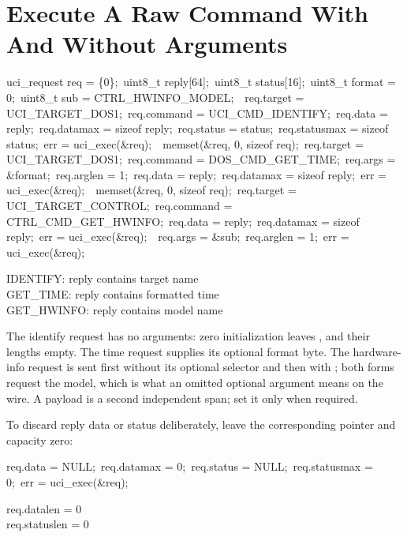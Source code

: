 \section{Execute A Raw Command With And Without Arguments}

\begin{listingbox}
uci\_request req = \{0\};\
uint8\_t reply[64];\
uint8\_t status[16];\
uint8\_t format = 0;\
uint8\_t sub = CTRL\_HWINFO\_MODEL;\
\
req.target = UCI\_TARGET\_DOS1;\
req.command = UCI\_CMD\_IDENTIFY;\
req.data = reply;\
req.datamax = sizeof reply;\
req.status = status;\
req.statusmax = sizeof status;\
err = uci\_exec(\&req);\
\
memset(\&req, 0, sizeof req);\
req.target = UCI\_TARGET\_DOS1;\
req.command = DOS\_CMD\_GET\_TIME;\
req.args = \&format;\
req.arglen = 1;\
req.data = reply;\
req.datamax = sizeof reply;\
err = uci\_exec(\&req);\
\
memset(\&req, 0, sizeof req);\
req.target = UCI\_TARGET\_CONTROL;\
req.command = CTRL\_CMD\_GET\_HWINFO;\
req.data = reply;\
req.datamax = sizeof reply;\
err = uci\_exec(\&req);\
\
req.args = \&sub;\
req.arglen = 1;\
err = uci\_exec(\&req);
\end{listingbox}

\begin{resultbox}
IDENTIFY: reply contains target name\\
GET_TIME: reply contains formatted time\\
GET_HWINFO: reply contains model name
\end{resultbox}

The identify request has no arguments: zero initialization leaves
\cmd{args},  and their lengths empty. The time request supplies
its optional format byte. The hardware-info request is sent first without its
optional selector and then with ; both forms request
the model, which is what an omitted optional argument means on the wire. A
payload is a second independent span; set it only when required.

To discard reply data or status deliberately, leave the corresponding pointer
and capacity zero:

\begin{listingbox}
req.data = NULL;\
req.datamax = 0;\
req.status = NULL;\
req.statusmax = 0;\
err = uci\_exec(\&req);
\end{listingbox}

\begin{resultbox}
req.datalen = 0\\
req.statuslen = 0
\end{resultbox}

